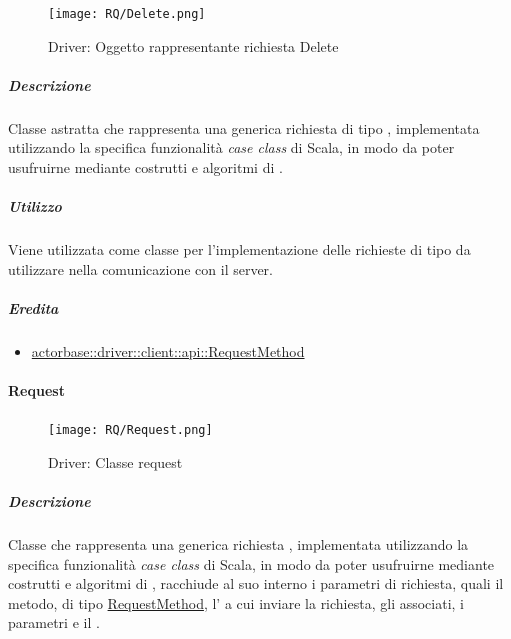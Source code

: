 \documentclass{scalatekids-article}
\begin{document}
\begin{figure}[H]
  \begin{center}
    \texttt{[image: RQ/Delete.png]}
    \caption{Driver: Oggetto rappresentante richiesta Delete}
  \end{center}
\end{figure}

\subparagraph{Descrizione}

Classe astratta che rappresenta una generica richiesta  di tipo
, implementata utilizzando la specifica funzionalità \textit{case
  class} di Scala, in modo da poter usufruirne mediante costrutti e algoritmi di
.

\subparagraph{Utilizzo}

Viene utilizzata come classe per l'implementazione delle richieste 
di tipo  da utilizzare nella comunicazione con il server.

\subparagraph{Eredita}

\begin{itemize}
\item \hyperref[sec:actorbase::driver::client::api::RequestMethod]{actorbase::driver::client::api::RequestMethod}
\end{itemize}


\paragraph{Request}
\label{sec:actorbase::driver::client::api::Request}

\begin{figure}[H]
  \begin{center}
    \texttt{[image: RQ/Request.png]}
    \caption{Driver: Classe request}
  \end{center}
\end{figure}

\subparagraph{Descrizione}

Classe che rappresenta una generica richiesta , implementata
utilizzando la specifica funzionalità \textit{case class} di Scala, in modo da
poter usufruirne mediante costrutti e algoritmi di ,
racchiude al suo interno i parametri di richiesta, quali il metodo, di tipo
\hyperref[sec:actorbase::driver::client::api::RequestMethod]{RequestMethod},
l' a cui inviare la richiesta, gli  
associati, i parametri e il .
\end{document}
